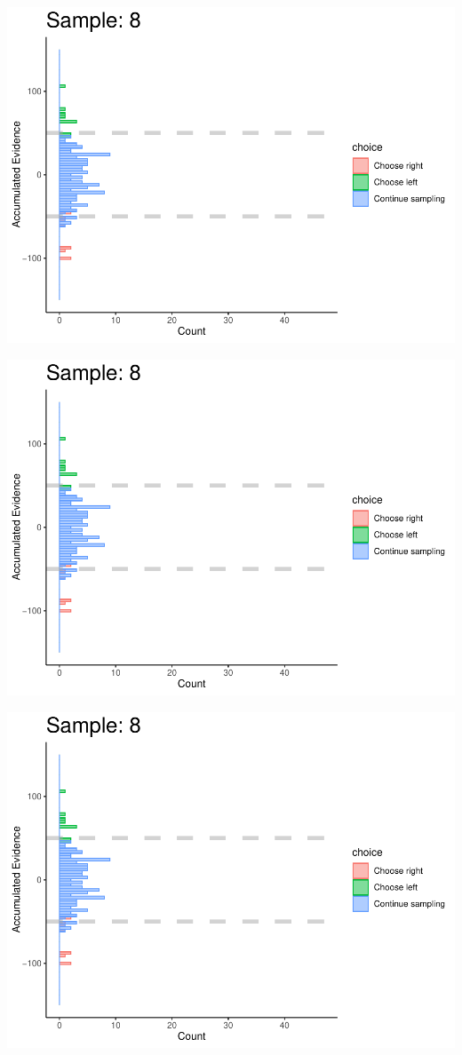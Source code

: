 \documentclass[
]{book}
\begin{document}
\begin{center}\includegraphics[width=0.8\linewidth]{LateNightBayes_files/figure-latex/fixed_check-70} \end{center}

\begin{center}\includegraphics[width=0.8\linewidth]{LateNightBayes_files/figure-latex/fixed_check-71} \end{center}

\begin{center}\includegraphics[width=0.8\linewidth]{LateNightBayes_files/figure-latex/fixed_check-72} \end{center}
\end{document}
